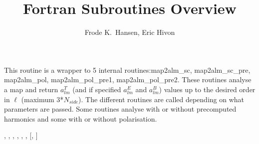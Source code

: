
\sloppy


\title{\healpix Fortran Subroutines Overview}
 \section[map2alm*]{ }
\label{sub:map2alm}
\author{Frode K.~Hansen, Eric Hivon}

\begin{facility}
{This routine is a wrapper to 5 internal routines:map2alm\_sc,
map2alm\_sc\_pre, map2alm\_pol, map2alm\_pol\_pre1,
map2alm\_pol\_pre2. These routines analyse a  map and return
$a_{lm}^T$ (and if specified $a_{lm}^E$ and $a_{lm}^B$) values up to
the desired order in $\ell$ (maximum 3*$N_{side}$). The different
routines are called depending on what parameters are passed. Some
routines analyse with or without precomputed harmonics and some with
or without polarisation. }
{\modAlmTools}
\end{facility}

\begin{f90format}
{%
, %
, %
, %
, %
, %
, %
 [, %
]}
\end{f90format}

